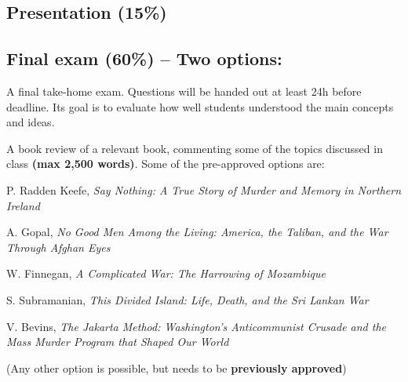 \documentclass[12pt, a4paper]{article}
\begin{document}

\subsection{Presentation (15\%)}

%

\subsection{Final exam (60\%) -- Two options:}

\begin{itemize}
  \item[\textbf{A.}] A final take-home exam. Questions will be handed out at least 24h before deadline. Its goal is to evaluate how well students understood the main concepts and ideas.
  \item[\textbf{B.}] A book review of a relevant book, commenting some of the topics discussed in class \textbf{(max 2,500 words)}. Some of the pre-approved options are:
  {\small
  \item[-] P. Radden Keefe, \textit{Say Nothing: A True Story of Murder and Memory in Northern Ireland} \vspace{-10pt}
  \item[-] A. Gopal, \textit{No Good Men Among the Living: America, the Taliban, and the War Through Afghan Eyes} \vspace{-10pt}
  \item[-] W. Finnegan, \textit{A Complicated War: The Harrowing of Mozambique} \vspace{-10pt}
  \item[-] S. Subramanian, \textit{This Divided Island: Life, Death, and the Sri Lankan War} \vspace{-10pt}
  \item[-] V. Bevins, \textit{The Jakarta Method: Washington's Anticommunist Crusade and the Mass Murder Program that Shaped Our World}
  }
  \item[] (Any other option is possible, but needs to be \textbf{previously approved})
\end{itemize}
\end{document}
